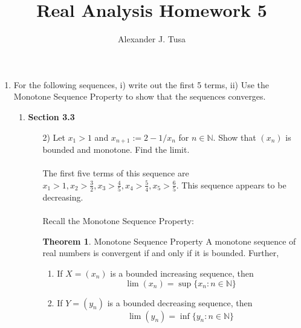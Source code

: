\documentclass[12pt,letterpaper]{article}
\author{Alexander J. Tusa}
\title{Real Analysis Homework 5}
\newcommand{\N}{\mathbb{N}}
\theoremstyle{case}
\theoremstyle{definition}
\newtheorem*{theorem*}{Theorem}
\begin{document}
	\maketitle
	\begin{enumerate}
	\item For the following sequences, i) write out the first 5 terms, ii) Use the Monotone Sequence Property to show that the sequences converges.
	\begin{enumerate}
		\item \textbf{Section 3.3}
		\begin{enumerate}
			\item[2)] Let $x_1 > 1$ and $x_{n+1} := 2-1/x_n$ for $n \in \N$. Show that $(x_n)$ is bounded and monotone. Find the limit.
			\\\\ The first five terms of this sequence are $x_1 >1,x_2 > \frac{3}{2}, x_3 >\frac{4}{5}, x_4 > \frac{5}{4}, x_5 > \frac{6}{5}$. This sequence appears to be decreasing.
			\\\\Recall the Monotone Sequence Property:
			\begin{theorem*}{Monotone Sequence Property}
				A monotone sequence of real numbers is convergent if and only if it is bounded. Further,
				\begin{enumerate}
					\item If $X=(x_n)$ is a bounded increasing sequence, then
					\[\lim (x_n) = \sup \{x_n:n \in \N\}\]
					
					\item If $Y=(y_n)$ is a bounded decreasing sequence, then
					\[\lim (y_n) = \inf \{y_n : n \in \N \}\]
				\end{enumerate}
			\end{theorem*}
		

\end{enumerate}
\end{enumerate}
\end{enumerate}
\end{document}
